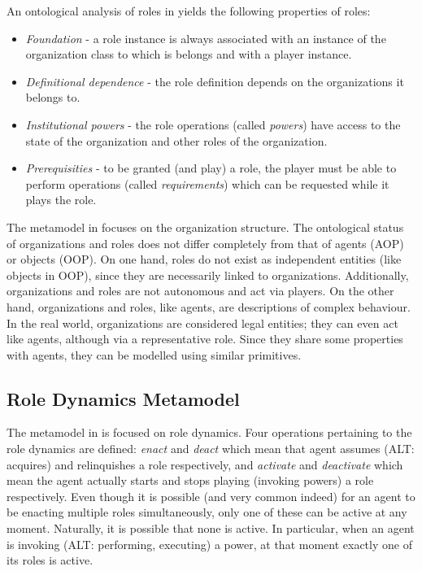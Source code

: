 An ontological analysis of roles in \cite{Boella04} yields the following properties of roles:
\begin{itemize}
	\item \textit{Foundation} - a role instance is always associated with an instance of the organization class to which is belongs and with a player instance.
	\item \textit{Definitional dependence} - the role definition depends on the organizations it belongs to.
	\item \textit{Institutional powers} - the role operations (called \textit{powers}) have access to the state of the organization and other roles of the organization.
	\item \textit{Prerequisities} - to be granted (and play) a role, the player must be able to perform operations (called \textit{requirements}) which can be requested while it plays the role.
\end{itemize}

The metamodel in \cite{Boella04} focuses on the organization structure.
The ontological status of organizations and roles \cite{Boella04} does not differ completely from that of agents (AOP) or objects (OOP).
On one hand, roles do not exist as independent entities (like objects in OOP), since they are necessarily linked to organizations.
Additionally, organizations and roles are not autonomous and act via players.
On the other hand, organizations and roles, like agents, are descriptions of complex behaviour.
In the real world, organizations are considered legal entities; they can even act like agents, although via a representative role.
Since they share some properties with agents, they can be modelled using similar primitives.

\subsection*{Role Dynamics Metamodel}

The metamodel in \cite{Dastani04} is focused on role dynamics.
Four operations pertaining to the role dynamics are defined: \textit{enact} and \textit{deact} which mean that agent assumes (ALT: acquires) and relinquishes a role respectively, and \textit{activate} and \textit{deactivate} which mean the agent actually starts and stops playing (invoking powers) a role respectively.
Even though it is possible (and very common indeed) for an agent to be enacting multiple roles simultaneously, only one of these can be active at any moment.
Naturally, it is possible that none is active.
In particular, when an agent is invoking (ALT: performing, executing) a power, at that moment exactly one of its roles is active.

